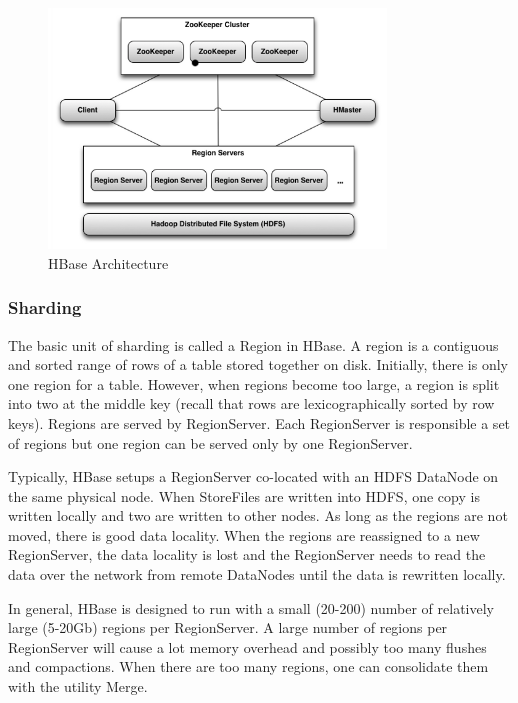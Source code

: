 \documentclass[12pt]{book}
\begin{document}
\begin{figure}[t]
\includegraphics[width=0.8\textwidth]{images/hbase-architecture.png}
\centering
\caption{HBase Architecture}
\end{figure}

\subsubsection{Sharding}

The basic unit of sharding is called a Region in HBase. A region is a contiguous and sorted range of rows of a table stored together on disk. Initially, there is only one region for a table. However, when regions become too large, a region is split into two at the middle key (recall that rows are lexicographically sorted by row keys). Regions are served by RegionServer. Each RegionServer is responsible a set of regions but one region can be served only by one RegionServer.

Typically, HBase setups a RegionServer co-located with an HDFS DataNode on the same physical node. When StoreFiles are written into HDFS, one copy is written locally and two are written to other nodes. As long as the regions are not moved, there is good data locality. When the regions are reassigned to a new RegionServer, the data locality is lost and the RegionServer needs to read the data over the network from remote DataNodes until the data is rewritten locally.

In general, HBase is designed to run with a small (20-200) number of relatively large (5-20Gb) regions per RegionServer. A large number of regions per RegionServer will cause a lot memory overhead and possibly too many flushes and compactions. When there are too many regions, one can consolidate them with the utility Merge.
\end{document}

